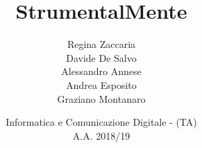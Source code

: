 
\newcommand{\theteam}{DARGA Group}

\newcommand{\ProjectTitle}{StrumentalMente}

\title{\ProjectTitle}

\author
{
	Regina Zaccaria\\
	Davide De Salvo\\
	Alessandro Annese\\
	Andrea Esposito\\
	Graziano Montanaro
}

\date
{
	Informatica e Comunicazione Digitale - (TA)\\
	{\Large A.A. 2018/19}
}